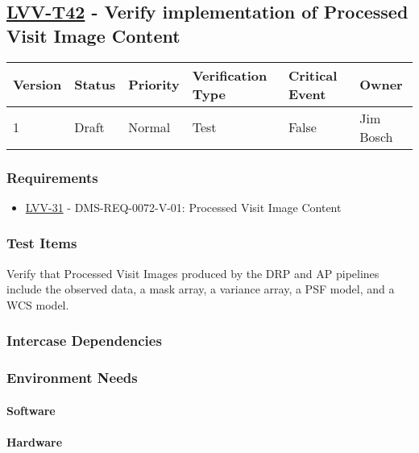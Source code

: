 \subsection{\href{https://jira.lsstcorp.org/secure/Tests.jspa\#/testCase/LVV-T42}{LVV-T42}
    - Verify implementation of Processed Visit Image Content}\label{lvv-t42}

\begin{longtable}[]{llllll}
\toprule
Version & Status & Priority & Verification Type & Critical Event & Owner
\\\midrule
1 & Draft & Normal &
Test & False & Jim Bosch
\\\bottomrule
\end{longtable}

\subsubsection{Requirements}
\begin{itemize}
\item \href{https://jira.lsstcorp.org/browse/LVV-31}{LVV-31} - DMS-REQ-0072-V-01: Processed Visit Image Content
\end{itemize}

\subsubsection{Test Items}
Verify that Processed Visit Images produced by the DRP and AP pipelines
include the observed data, a mask array, a variance array, a PSF model,
and a WCS model.



\subsubsection{Intercase Dependencies}

\subsubsection{Environment Needs}

\paragraph{Software}

\paragraph{Hardware}


